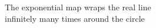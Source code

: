 \documentclass[preview]{standalone}
\begin{document}
\begin{center}
The exponential map wraps the real line\\infinitely many times around the circle
\end{center}
\end{document}
